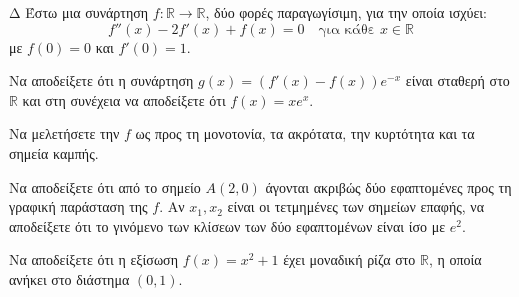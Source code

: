 \begin{thema}{Δ}
Έστω μια συνάρτηση $f: \mathbb{R} \to \mathbb{R}$, δύο φορές παραγωγίσιμη, για την οποία ισχύει:
\[ f''(x) - 2f'(x) + f(x) = 0 \quad \text{για κάθε } x \in \mathbb{R} \]
με $f(0) = 0$ και $f'(0) = 1$.
\begin{erwthma}
    \item Να αποδείξετε ότι η συνάρτηση $g(x) = (f'(x) - f(x))e^{-x}$ είναι σταθερή στο $\mathbb{R}$ και στη συνέχεια να αποδείξετε ότι $f(x) = x e^x$.
    \item Να μελετήσετε την $f$ ως προς τη μονοτονία, τα ακρότατα, την κυρτότητα και τα σημεία καμπής.
    \item Να αποδείξετε ότι από το σημείο $A(2, 0)$ άγονται ακριβώς δύο εφαπτομένες προς τη γραφική παράσταση της $f$. Αν $x_1, x_2$ είναι οι τετμημένες των σημείων επαφής, να αποδείξετε ότι το γινόμενο των κλίσεων των δύο εφαπτομένων είναι ίσο με $e^2$.
    \item Να αποδείξετε ότι η εξίσωση $f(x) = x^2 + 1$ έχει μοναδική ρίζα στο $\mathbb{R}$, η οποία ανήκει στο διάστημα $(0, 1)$.
\end{erwthma}
\end{thema}
